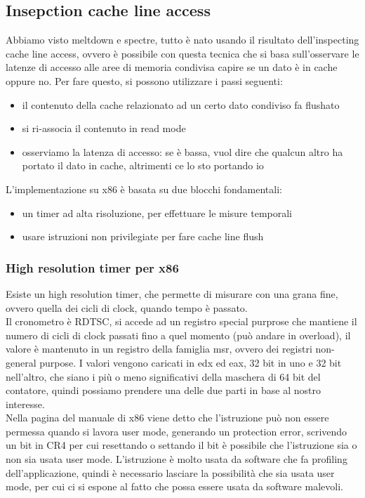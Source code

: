 \documentclass[12pt, oneside]{extbook}
\begin{document}
\subsection{Insepction cache line access}
Abbiamo visto meltdown e spectre, tutto è nato usando il risultato dell'inspecting cache line access, ovvero è possibile con questa tecnica che si basa sull'osservare le latenze di accesso alle aree di memoria condivisa capire se un dato è in cache oppure no. Per fare questo, si possono utilizzare i passi seguenti:
\begin{itemize}
\item il contenuto della cache relazionato ad un certo dato condiviso fa flushato
\item si ri-associa il contenuto in read mode
\item osserviamo la latenza di accesso: se è bassa, vuol dire che qualcun altro ha portato il dato in cache, altrimenti  ce lo sto portando io
\end{itemize}
L'implementazione su x86 è basata su due blocchi fondamentali:
\begin{itemize}
\item un timer ad alta risoluzione, per effettuare le misure temporali
\item usare istruzioni non privilegiate per fare cache line flush
\end{itemize}
\subsubsection{High resolution timer per x86}
Esiste un high resolution timer, che permette di misurare con una grana fine, ovvero quella dei cicli di clock, quando tempo è passato.\\ Il cronometro è RDTSC, si accede ad un registro special purprose che mantiene il numero di cicli di clock passati fino a quel momento (può andare in overload), il valore è mantenuto in un registro della famiglia msr, ovvero dei registri non-general purpose. I valori vengono caricati in edx ed eax, 32 bit in uno e 32 bit nell'altro, che siano i più o meno significativi della maschera di 64 bit del contatore, quindi possiamo prendere una delle due parti in base al nostro interesse.\\ Nella pagina del manuale di x86 viene detto che l'istruzione può non essere permessa quando si lavora user mode, generando un protection error, scrivendo un bit in CR4 per cui resettando o settando il bit è possibile che l'istruzione sia o non sia usata user mode. L'istruzione è molto usata da software che fa profiling dell'applicazione, quindi è necessario lasciare la possibilità che sia usata user mode, per cui ci si espone al fatto che possa essere usata da software malevoli.
\end{document}
